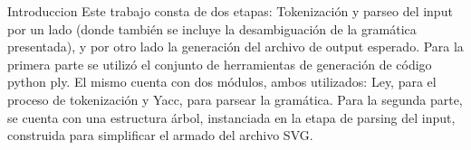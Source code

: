 \begin{section}{Introduccion}
Este trabajo consta de dos etapas: Tokenizaci\'on y parseo del input por un lado (donde tambi\'en se incluye la desambiguaci\'on de la gram\'atica presentada), y por otro lado la generaci\'on del archivo de output esperado.
Para la primera parte se utiliz\'o el conjunto de herramientas de generaci\'on de c\'odigo python ply. El mismo cuenta con dos m\'odulos, ambos utilizados: Ley, para el proceso de tokenizaci\'on y Yacc, para parsear la gram\'atica.
Para la segunda parte, se cuenta con una estructura \'arbol, instanciada en la etapa de parsing del input, construida para simplificar el armado del archivo SVG.

\end{section}
